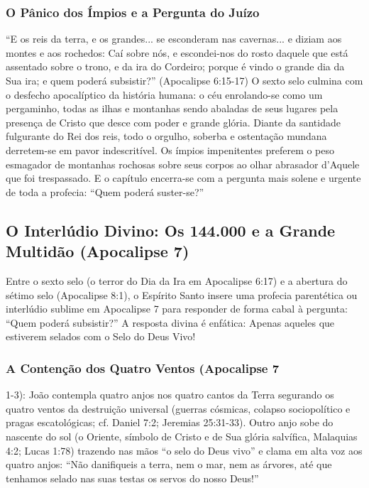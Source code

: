 \subsubsection*{O Pânico dos Ímpios e a Pergunta do Juízo}
``E os reis da terra, e os grandes... se esconderam nas cavernas... e diziam aos montes e aos rochedos: Caí sobre nós, e escondei-nos do rosto daquele que está assentado sobre o trono, e da ira do Cordeiro; porque é vindo o grande dia da Sua ira; e quem poderá subsistir?'' (Apocalipse 6:15-17)
O sexto selo culmina com o desfecho apocalíptico da história humana: o céu enrolando-se como um pergaminho, todas as ilhas e montanhas sendo abaladas de seus lugares pela presença de Cristo que desce com poder e grande glória. Diante da santidade fulgurante do Rei dos reis, todo o orgulho, soberba e ostentação mundana derretem-se em pavor indescritível. Os ímpios impenitentes preferem o peso esmagador de montanhas rochosas sobre seus corpos ao olhar abrasador d'Aquele que foi trespassado. E o capítulo encerra-se com a pergunta mais solene e urgente de toda a profecia: ``Quem poderá suster-se?''



\subsection{O Interlúdio Divino: Os 144.000 e a Grande Multidão (Apocalipse 7)}


Entre o sexto selo (o terror do Dia da Ira em Apocalipse 6:17) e a abertura do sétimo selo (Apocalipse 8:1), o Espírito Santo insere uma profecia parentética ou interlúdio sublime em Apocalipse 7 para responder de forma cabal à pergunta: ``Quem poderá subsistir?''
A resposta divina é enfática: Apenas aqueles que estiverem selados com o Selo do Deus Vivo!


\subsubsection*{A Contenção dos Quatro Ventos (Apocalipse 7}
1-3):
João contempla quatro anjos nos quatro cantos da Terra segurando os quatro ventos da destruição universal (guerras cósmicas, colapso sociopolítico e pragas escatológicas; cf. Daniel 7:2; Jeremias 25:31-33). Outro anjo sobe do nascente do sol (o Oriente, símbolo de Cristo e de Sua glória salvífica, Malaquias 4:2; Lucas 1:78) trazendo nas mãos ``o selo do Deus vivo'' e clama em alta voz aos quatro anjos: ``Não danifiqueis a terra, nem o mar, nem as árvores, até que tenhamos selado nas suas testas os servos do nosso Deus!''


